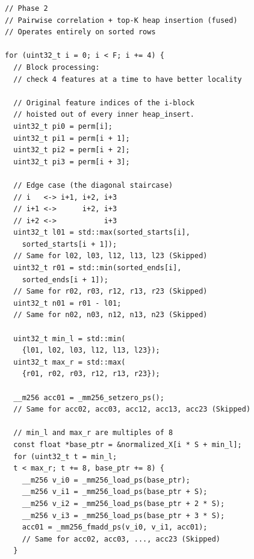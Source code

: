 \documentclass[letterpaper]{article}
\begin{document}
{\fontsize{8}{10}\selectfont
\begin{Verbatim}
// Phase 2
// Pairwise correlation + top-K heap insertion (fused)
// Operates entirely on sorted rows

for (uint32_t i = 0; i < F; i += 4) {
  // Block processing: 
  // check 4 features at a time to have better locality

  // Original feature indices of the i-block
  // hoisted out of every inner heap_insert.
  uint32_t pi0 = perm[i];
  uint32_t pi1 = perm[i + 1];
  uint32_t pi2 = perm[i + 2];
  uint32_t pi3 = perm[i + 3];

  // Edge case (the diagonal staircase)
  // i   <-> i+1, i+2, i+3
  // i+1 <->      i+2, i+3
  // i+2 <->           i+3
  uint32_t l01 = std::max(sorted_starts[i], 
    sorted_starts[i + 1]);
  // Same for l02, l03, l12, l13, l23 (Skipped)
  uint32_t r01 = std::min(sorted_ends[i], 
    sorted_ends[i + 1]);
  // Same for r02, r03, r12, r13, r23 (Skipped)
  uint32_t n01 = r01 - l01;
  // Same for n02, n03, n12, n13, n23 (Skipped)

  uint32_t min_l = std::min(
    {l01, l02, l03, l12, l13, l23});
  uint32_t max_r = std::max(
    {r01, r02, r03, r12, r13, r23});

  __m256 acc01 = _mm256_setzero_ps();
  // Same for acc02, acc03, acc12, acc13, acc23 (Skipped)

  // min_l and max_r are multiples of 8
  const float *base_ptr = &normalized_X[i * S + min_l];
  for (uint32_t t = min_l; 
  t < max_r; t += 8, base_ptr += 8) {
    __m256 v_i0 = _mm256_load_ps(base_ptr);
    __m256 v_i1 = _mm256_load_ps(base_ptr + S);
    __m256 v_i2 = _mm256_load_ps(base_ptr + 2 * S);
    __m256 v_i3 = _mm256_load_ps(base_ptr + 3 * S);
    acc01 = _mm256_fmadd_ps(v_i0, v_i1, acc01);
    // Same for acc02, acc03, ..., acc23 (Skipped)
  }


\end{Verbatim}}
\end{document}
